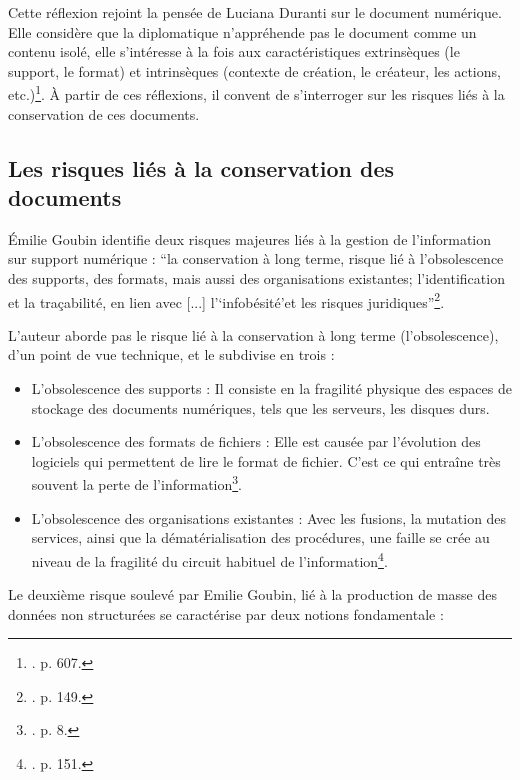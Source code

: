 Cette réflexion rejoint la pensée de Luciana Duranti sur le document numérique. Elle considère que la diplomatique n'appréhende pas le document comme un contenu isolé, elle s’intéresse à la fois aux caractéristiques extrinsèques (le support, le format) et intrinsèques (contexte de création, le créateur, les actions, etc.)\footnote{\cite{duranti-2003}. p. 607.}. À partir de ces réflexions, il convent de s’interroger sur les risques liés à la conservation de ces documents.


\subsection*{Les risques liés à la conservation des documents}

Émilie Goubin identifie deux risques majeures liés à la gestion de l'information sur support numérique : \enquote{la conservation à long terme, risque lié à l'obsolescence des supports, des formats, mais aussi des organisations existantes; l'identification et la traçabilité, en lien avec [...] l'\enquote*{infobésité}et les risques juridiques}\footnote{\cite{goubin-2016}. p. 149.}. 

L'auteur aborde pas le risque lié à la conservation à long terme (l'obsolescence), d'un point de vue technique, et le subdivise en trois : 

\begin{itemize}[label=---]
	
\item{L'obsolescence des supports} : Il consiste en la fragilité physique des espaces de stockage des documents numériques, tels que les serveurs, les disques durs. 
\item{L'obsolescence des formats de fichiers} : Elle est causée par l'évolution des logiciels qui permettent de lire le format de fichier. C'est ce qui entraîne très souvent la perte de l'information\footnote{\cite{archives-en-musees-electroniques}. p. 8.}.
\item{L'obsolescence des organisations existantes} : Avec les fusions, la mutation des services, ainsi que la dématérialisation des procédures, une faille se crée au niveau de la fragilité du circuit habituel de l'information\footnote{\cite{goubin-2016}. p. 151.}. \\[0.1cm]

\end{itemize}

Le deuxième risque soulevé par Emilie Goubin, lié à la production de masse des données non structurées se caractérise par deux notions fondamentale : 

